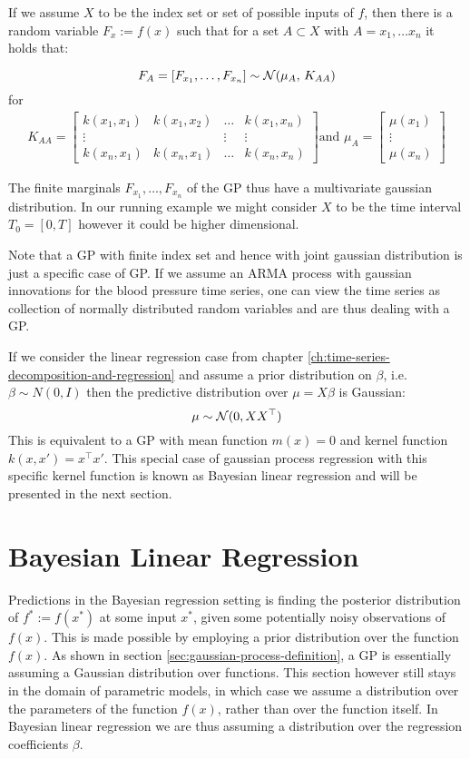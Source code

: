If we assume $X$ to be the index set or set of possible inputs of $f$, then there is a random variable
$F_x := f(x)$ such that for a set $A \subset X$ with $A={x_1, \dots x_n}$ it holds that:

\[F_A = [F_{x_1}, \dots , F_{x_n}] \sim \operatorname{\mathcal{N}}(\mu_A,\,K_{AA})\]
for
\begin{gather}\label{def:Kernel-Matrix}
    K_{AA} =
    \begin{bmatrix}
        k(x_1, x_1) & k(x_1, x_2) & \dots & k(x_1, x_n)\\
        \vdots  &  & \vdots  & \vdots \\
        k(x_n, x_1)  & k(x_n, x_1) & \dots  & k(x_n, x_n)
    \end{bmatrix} \text{and }
    \mu_A =
    \begin{bmatrix}
        \mu(x_1) \\
        \vdots \\
        \mu(x_n)
    \end{bmatrix}
\end{gather}

The finite marginals $F_{x_1}, \dots, F_{x_n}$ of the GP thus have a multivariate gaussian distribution.
In our running example we might consider $X$ to be the time interval $T_0=[0, T]$ however it could be higher dimensional.

Note that a GP with finite index set and hence with joint gaussian distribution is just a specific case
of GP. If we assume an ARMA process with gaussian innovations for the blood pressure time series, one can view the time series
as collection of normally distributed random variables and are thus dealing with a GP.


If we consider the linear regression case from chapter \ref{ch:time-series-decomposition-and-regression} and assume a
prior distribution
on $\beta$, i.e. $\beta \sim N(0, I)$ then the predictive distribution over $\mu = X \beta$ is Gaussian:
\[
    \mu \sim \operatorname{\mathcal{N}}(0, XX^{\top})
\]
This is equivalent to a GP with mean function $m(x) = 0$ and kernel function $k(x, x') = x^{\top}x'$.
This special case of gaussian process regression with this specific kernel function is known as Bayesian linear regression
and will be presented in the next section.


\section{Bayesian Linear Regression}\label{subsec:bayesian-linear-regression}
Predictions in the Bayesian regression setting is finding the posterior distribution of
$f^{\ast} := f(x^{\ast})$ at some input $x^{\ast}$, given some potentially noisy observations of $f(x)$.
This is made possible by employing a prior distribution
over the function $f(x)$.
As shown in section \ref{sec:gaussian-process-definition}, a GP is essentially
assuming a Gaussian distribution over functions.
This section however still stays in the domain of parametric models,
in which case we assume a distribution over the parameters of the function $f(x)$,
rather than over the function itself.
In Bayesian linear regression we are thus assuming a distribution over the
regression coefficients $\beta$.

